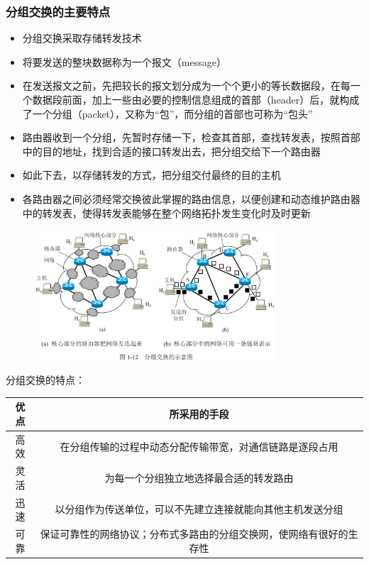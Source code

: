 \documentclass[cs4size,a4paper,10pt]{ctexart}
\begin{document}
	\subsubsection{分组交换的主要特点}
	\begin{itemize}
		\item 分组交换采取存储转发技术
		\item 将要发送的整块数据称为一个报文（message）
		\item 在发送报文之前，先把较长的报文划分成为一个个更小的等长数据段，在每一个数据段前面，加上一些由必要的控制信息组成的首部（header）后，就构成了一个分组（packet），又称为“包”，而分组的首部也可称为“包头”
		\item 路由器收到一个分组，先暂时存储一下，检查其首部，查找转发表，按照首部中的目的地址，找到合适的接口转发出去，把分组交给下一个路由器
		\item 如此下去，以存储转发的方式，把分组交付最终的目的主机
		\item 各路由器之间必须经常交换彼此掌握的路由信息，以便创建和动态维护路由器中的转发表，使得转发表能够在整个网络拓扑发生变化时及时更新
	\end{itemize}

	\begin{figure}[H]
		\centering
		\includegraphics[width=0.8\textwidth]{img/1.12}
	\end{figure}

	分组交换的特点：
	\begin{table}[H]
		\centering
		\begin{tabular}{|c|c|}
		\hline
		优点 & 所采用的手段                             \\ \hline
		高效 & 在分组传输的过程中动态分配传输带宽，对通信链路是逐段占用       \\ \hline
		灵活 & 为每一个分组独立地选择最合适的转发路由                \\ \hline
		迅速 & 以分组作为传送单位，可以不先建立连接就能向其他主机发送分组      \\ \hline
		可靠 & 保证可靠性的网络协议；分布式多路由的分组交换网，使网络有很好的生存性 \\ \hline
		\end{tabular}
	\end{table}
\end{document}
